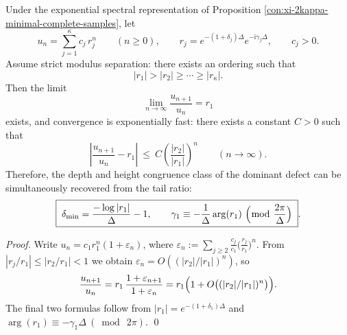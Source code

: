 \begin{proposition}\label{prop:xi-scan-tail-ratio-dominant-defect}
Under the exponential spectral representation of Proposition \ref{con:xi-2kappa-minimal-complete-samples}, let
\[
u_n=\sum_{j=1}^{\kappa}c_j\,r_j^{n}\qquad(n\ge 0),
\qquad
r_j=e^{-(1+\delta_j)\Delta}e^{-\mathrm{i}\gamma_j\Delta},
\qquad c_j>0.
\]
Assume strict modulus separation: there exists an ordering such that
\[
|r_1|>|r_2|\ge\cdots\ge|r_\kappa|.
\]
Then the limit
\[
\boxed{\;\lim_{n\to\infty}\frac{u_{n+1}}{u_n}=r_1\;}
\]
exists, and convergence is exponentially fast: there exists a constant \(C>0\) such that
\[
\left|\frac{u_{n+1}}{u_n}-r_1\right|
\ \le\ C\left(\frac{|r_2|}{|r_1|}\right)^{n}\qquad(n\to\infty).
\]
Therefore, the depth and height congruence class of the dominant defect can be simultaneously recovered from the tail ratio:
\[
\boxed{\;
\delta_{\min}=\frac{-\log|r_1|}{\Delta}-1,
\qquad
\gamma_1\equiv-\frac{1}{\Delta}\arg(r_1)\ \Bigl(\bmod\ \frac{2\pi}{\Delta}\Bigr)\; }.
\]
\end{proposition}
\begin{proof}
Write \(u_n=c_1r_1^n(1+\varepsilon_n)\), where
\(
\varepsilon_n:=\sum_{j\ge 2}\frac{c_j}{c_1}\bigl(\frac{r_j}{r_1}\bigr)^n
\).
From \(|r_j/r_1|\le |r_2/r_1|<1\) we obtain \(\varepsilon_n=O((|r_2|/|r_1|)^n)\), so
\[
\frac{u_{n+1}}{u_n}
=r_1\,\frac{1+\varepsilon_{n+1}}{1+\varepsilon_n}
=r_1\Bigl(1+O\bigl((|r_2|/|r_1|)^n\bigr)\Bigr).
\]
The final two formulas follow from \(|r_1|=e^{-(1+\delta_1)\Delta}\) and \(\arg(r_1)\equiv-\gamma_1\Delta\ (\bmod\ 2\pi)\). \qed
\end{proof}

